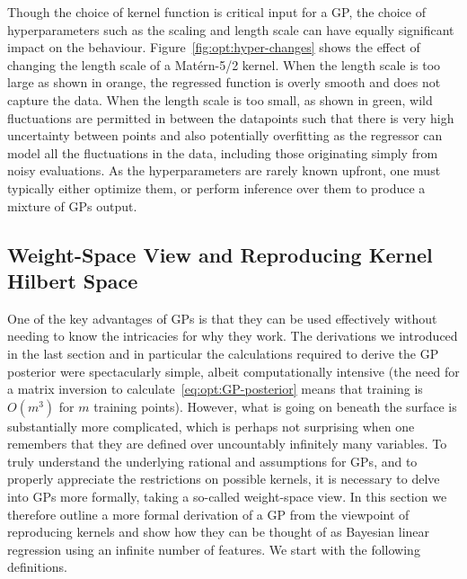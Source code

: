 Though the choice of kernel function is critical input for a GP, the choice of
hyperparameters such as the scaling and length scale can have equally
significant impact on the behaviour.  Figure~\ref{fig:opt:hyper-changes} shows
the effect of changing the length scale of a Mat\'{e}rn-5/2 kernel.  When the length
scale is too large as shown in orange, the regressed function is overly smooth and
does not capture the data.  When the length scale is too small, as shown in green,
wild fluctuations are permitted in between the datapoints such that there is very
high uncertainty between points and also potentially overfitting as the regressor
can model all the fluctuations in the data, including those originating simply from
noisy evaluations.
As the hyperparameters are rarely known upfront, one must typically either optimize
them, or perform inference over them to produce a mixture of GPs output.

\subsection{Weight-Space View and Reproducing Kernel Hilbert Space}
\label{sec:opt:gps:weight}

One of the key advantages of GPs is that they can be used effectively without needing
to know the intricacies for why they work.  The derivations we introduced in the
last section and in particular the calculations required to derive the GP posterior were
spectacularly simple, albeit computationally intensive (the need for a matrix inversion
to calculate~\eqref{eq:opt:GP-posterior} means that training is $O(m^3)$ for
$m$ training points).  However, what is going on beneath the surface is substantially
more complicated, which is perhaps not surprising when one remembers that they
are defined over uncountably infinitely many variables.  
To truly understand the underlying rational and assumptions for GPs, and to properly
appreciate the restrictions on possible kernels, it is necessary to delve into GPs more
formally, taking a so-called weight-space view.
In this section we therefore outline a more formal derivation of a GP
from the viewpoint of reproducing kernels \citep{hofmann2008kernel}
and show how they can be thought of as Bayesian linear regression
using an infinite number of features.
We start with the following definitions.

